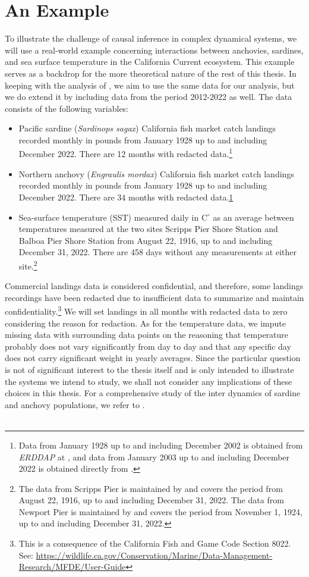 \documentclass[11pt, a4paper]{memoir}
\theoremstyle{break}
\theoremstyle{break}
\theoremstyle{nonumberplain}
\begin{document}
\section{An Example}
To illustrate the challenge of causal inference in complex dynamical systems, we will use a real-world example concerning interactions between anchovies, sardines, and sea surface temperature in the California Current ecosystem. This example serves as a backdrop for the more theoretical nature of the rest of this thesis. In keeping with the analysis of \cite{Sugihara}, we aim to use the same data for our analysis, but we do extend it by including data from the period 2012-2022 as well. The data consists of the following variables:
\begin{itemize}
\item Pacific sardine (\textit{Sardinops sagax}) California fish market catch landings recorded monthly in pounds from January 1928 up to and including December 2022. There are 12 months with redacted data.\footnote{\label{note1}Data from January 1928 up to and including December 2002 is obtained from \textit{ERDDAP} at \cite{oldData}, and data from January 2003 up to and including December 2022 is obtained directly from \cite{newData}.}
\item Northern anchovy (\textit{Engraulis mordax}) California fish market catch landings recorded monthly in pounds from January 1928 up to and including December 2022. There are 34 months with redacted data.\cref{note1} 
\item  Sea-surface temperature (SST) measured daily in $\text{C}^\circ$ as an average between temperatures measured at the two sites Scripps Pier Shore Station and Balboa Pier Shore Station from August 22, 1916, up to and including December 31, 2022. There are 458 days without any measurements at either site.\footnote{The data from Scripps Pier is maintained by \cite{Scripps} and covers the period from August 22, 1916, up to and including December 31, 2022. The data from Newport Pier is maintained by \cite{Newport} and covers the period from November 1, 1924, up to and including December 31, 2022.} 
\end{itemize}
Commercial landings data is considered confidential, and therefore, some landings recordings have been redacted due to insufficient data to summarize and maintain confidentiality.\footnote{This is a consequence of the California Fish and Game Code Section 8022. See: \url{https://wildlife.ca.gov/Conservation/Marine/Data-Management-Research/MFDE/User-Guide}} We will set landings in all months with redacted data to zero considering the reason for redaction. As for the temperature data, we impute missing data with surrounding data points on the reasoning that temperature probably does not vary significantly from day to day and that any specific day does not carry significant weight in yearly averages. Since the particular question is not of significant interest to the thesis itself and is only intended to illustrate the systems we intend to study, we shall not consider any implications of these choices in this thesis. For a comprehensive study of the inter dynamics of sardine and anchovy populations, we refer to \cite{Sardine}.\\\\
\end{document}
